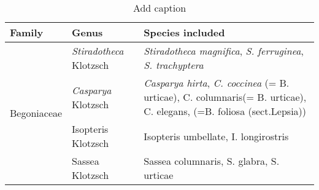 \begin{table}[htbp]
  \centering
  \caption{Add caption}
    \begin{tabular}{cll}
    \toprule
    \multicolumn{1}{l}{Family} & Genus & Species included \\
    \midrule
    \multirow{4}[8]{*}{Begoniaceae} & \textit{Stiradotheca} Klotzsch & \textit{Stiradotheca magnifica}, \textit{S. ferruginea}, \textit{S. trachyptera} \\
\cmidrule{2-3}          & \textit{Casparya} Klotzsch & \multicolumn{1}{p{37.355em}}{\textit{Casparya hirta}, \textit{C. coccinea} (= B. urticae), C. columnaris\newline{}(= B. urticae), C. elegans, (=B. foliosa (sect.\newline{}Lepsia))} \\
\cmidrule{2-3}          & Isopteris Klotzsch & Isopteris umbellate, I. longirostris \\
\cmidrule{2-3}          & Sassea Klotzsch & Sassea columnaris, S. glabra, S. urticae \\
    \bottomrule
    \bottomrule
    \end{tabular}%
  \label{tab:addlabel}%
\end{table}%
